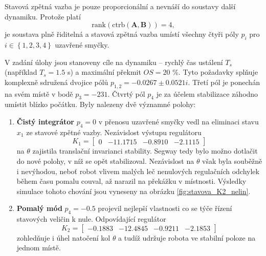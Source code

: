 \documentclass[conference]{IEEEtran}
\begin{document}
Stavová zpětná vazba je pouze proporcionální a nevnáší do soustavy další dynamiku. Protože platí
\begin{equation}
    \text{rank}(\text{ctrb}(\mathbf{A}, \mathbf{B})) = 4,
\end{equation}
je soustava plně řiditelná a stavová zpětná vazba umístí všechny čtyři póly $p_i$ pro $i \in \left\{1, 2,3,4\right\}$ uzavřené smyčky.

V zadání úlohy jsou stanoveny cíle na dynamiku -- rychlý čas ustálení $T_s$ (například $T_s = 1.5$ \si{\second}) a maximální překmit $OS = 20$ \%.
Tyto požadavky  splňuje komplexně sdružená dvojice pólů $p_{1,2} = -0.0267 \pm 0.0521i$.
Třetí pól je ponechán na svém místě v bodě $p_3 = -231$. Čtvrtý pól $p_4$ je za účelem stabilizace záhodno umístit blízko počátku.
Byly nalezeny dvě významné polohy:
\begin{enumerate}
    \item \textbf{Čistý integrátor} $p_4 = 0$ v přenosu uzavřené smyčky vedl na eliminaci stavu $x_1$ ze stavové zpětné vazby.
    Nezávislost výstupu regulátoru 
    \begin{equation*}
        K_1 = \begin{bmatrix}
            0 & -11.1715  & -0.8910  & -2.1115
        \end{bmatrix}
    \end{equation*}
    na $\theta$ zajistila translační invarianci stability. Segway tedy bylo možno dotlačit do nové polohy, v níž se opět stabilizoval. Nezávislost na $\theta$
    však byla souběžně i nevýhodou, neboť robot vlivem malých leč nenulových regulačních odchylek během času pomalu couval, až narazil na překážku v místnosti.
    Výsledky simulace tohoto chování jsou vyneseny na obrázku \ref{fig:stavova_K2_nelin}.

    \item \textbf{Pomalý mód} $p_4 = -0.5$ projevil nejlepší vlastnosti co se týče řízení stavových veličin k nule. Odpovídající regulátor
    \begin{equation*}
        K_2 = \begin{bmatrix}
            -0.1883 & -12.4845 &  -0.9211 &  -2.1853
        \end{bmatrix}
    \end{equation*}
    zohledňuje i úhel natočení kol $\theta$ a tudíž udržuje robota ve stabilní poloze na jednom místě.
\end{enumerate}
\end{document}
